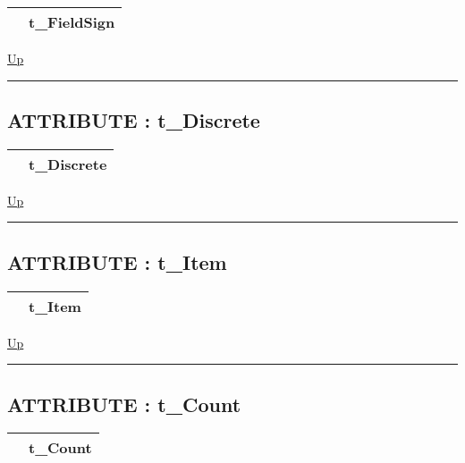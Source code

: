 {\renewcommand{\arraystretch}{1.5}
\begin{tabularx}{\textwidth}{|>{\raggedright\arraybackslash}l|X|}
\hline
\hspace{0pt} & t\_FieldSign \\
\hline
\end{tabularx}
}

\hyperlink{ecldoc:ML_Core.Types}{Up}

\par


\rule{\textwidth}{0.4pt}
\subsection*{ATTRIBUTE : t\_Discrete}
\hypertarget{ecldoc:ml_core.types.t_discrete}{}

{\renewcommand{\arraystretch}{1.5}
\begin{tabularx}{\textwidth}{|>{\raggedright\arraybackslash}l|X|}
\hline
\hspace{0pt} & t\_Discrete \\
\hline
\end{tabularx}
}

\hyperlink{ecldoc:ML_Core.Types}{Up}

\par


\rule{\textwidth}{0.4pt}
\subsection*{ATTRIBUTE : t\_Item}
\hypertarget{ecldoc:ml_core.types.t_item}{}

{\renewcommand{\arraystretch}{1.5}
\begin{tabularx}{\textwidth}{|>{\raggedright\arraybackslash}l|X|}
\hline
\hspace{0pt} & t\_Item \\
\hline
\end{tabularx}
}

\hyperlink{ecldoc:ML_Core.Types}{Up}

\par


\rule{\textwidth}{0.4pt}
\subsection*{ATTRIBUTE : t\_Count}
\hypertarget{ecldoc:ml_core.types.t_count}{}

{\renewcommand{\arraystretch}{1.5}
\begin{tabularx}{\textwidth}{|>{\raggedright\arraybackslash}l|X|}
\hline
\hspace{0pt} & t\_Count \\
\hline
\end{tabularx}
}

